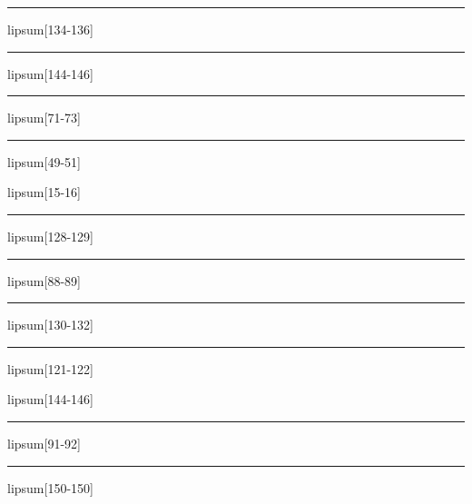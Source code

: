 \documentclass[11pt,a4paper]{article}
\begin{document}
\begin{simplewrap}
  \textcolor{pink!32}{\rule{4.4cm}{3.7cm}}
\end{simplewrap}
lipsum[134-136]

\begin{simplewrap}
  \textcolor{pink!47}{\rule{3.3cm}{6.1cm}}
\end{simplewrap}
lipsum[144-146]

\begin{simplewrap}
  \textcolor{violet!29}{\rule{5.1cm}{5.9cm}}
\end{simplewrap}
lipsum[71-73]

\begin{simplewrap}
  \textcolor{teal!26}{\rule{5.0cm}{9.6cm}}
\end{simplewrap}
lipsum[49-51]

lipsum[15-16]

\begin{simplewrap}
  \textcolor{pink!52}{\rule{4.0cm}{3.1cm}}
\end{simplewrap}
lipsum[128-129]

\begin{simplewrap}
  \textcolor{teal!36}{\rule{4.2cm}{7.9cm}}
\end{simplewrap}
lipsum[88-89]

\begin{simplewrap}
  \textcolor{magenta!53}{\rule{4.6cm}{8.3cm}}
\end{simplewrap}
lipsum[130-132]

\begin{simplewrap}
  \textcolor{cyan!52}{\rule{5.6cm}{3.4cm}}
\end{simplewrap}
lipsum[121-122]

lipsum[144-146]

\begin{simplewrap}
  \textcolor{cyan!53}{\rule{5.7cm}{7.2cm}}
\end{simplewrap}
lipsum[91-92]

\begin{simplewrap}
  \textcolor{violet!36}{\rule{5.4cm}{4.7cm}}
\end{simplewrap}
lipsum[150-150]
\end{document}
